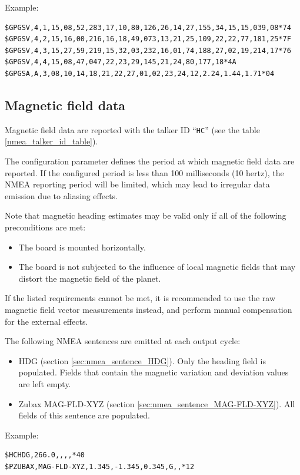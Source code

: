 \documentclass{zubaxdoc}
\begin{document}
Example:
\begin{verbatim}
$GPGSV,4,1,15,08,52,283,17,10,80,126,26,14,27,155,34,15,15,039,08*74
$GPGSV,4,2,15,16,00,216,16,18,49,073,13,21,25,109,22,22,77,181,25*7F
$GPGSV,4,3,15,27,59,219,15,32,03,232,16,01,74,188,27,02,19,214,17*76
$GPGSV,4,4,15,08,47,047,22,23,29,145,21,24,80,177,18*4A
$GPGSA,A,3,08,10,14,18,21,22,27,01,02,23,24,12,2.24,1.44,1.71*04
\end{verbatim}

\subsection{Magnetic field data}

Magnetic field data are reported with the talker ID ``\verb|HC|'' (see the table \ref{nmea_talker_id_table}).

The configuration parameter  defines the period at which magnetic field data are reported.
If the configured period is less than 100 milliseconds (10 hertz),
the NMEA reporting period will be limited,
which may lead to irregular data emission due to aliasing effects.

Note that magnetic heading estimates may be valid only if all of the following preconditions are met:
\begin{itemize}
    \item The board is mounted horizontally.
    \item The board is not subjected to the influence of local magnetic fields that may distort the magnetic field
          of the planet.
\end{itemize}
If the listed requirements cannot be met, it is recommended to use the raw magnetic field vector measurements instead,
and perform manual compensation for the external effects.

The following NMEA sentences are emitted at each output cycle:
\begin{itemize}
    \item HDG (section \ref{sec:nmea_sentence_HDG}). Only the heading field is populated.
          Fields that contain the magnetic variation and deviation values are left empty.
    \item Zubax MAG-FLD-XYZ (section \ref{sec:nmea_sentence_MAG-FLD-XYZ}).
          All fields of this sentence are populated.
\end{itemize}

Example:
\begin{verbatim}
$HCHDG,266.0,,,,*40
$PZUBAX,MAG-FLD-XYZ,1.345,-1.345,0.345,G,,*12
\end{verbatim}
\end{document}
